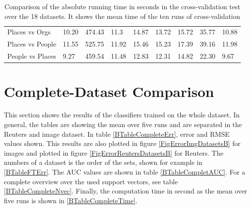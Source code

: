 \begin{table}[]
{\begin{tabular}{@{}lllllllll@{}}
			Places vs Orgs        & 10.20 & 474.43 & 11.3 & 14.87         & 13.72 & 15.72 & 35.77 & 10.88 \\
			Places vs People      & 11.55 & 525.75 & 11.92 & 15.46         & 15.23 & 17.39 & 39.16 & 11.98 \\
			People vs Places      & 9.27  & 459.54 & 11.48 & 12.83         & 12.31 & 14.82 & 22.30 & 9.67  \\ \bottomrule
	\end{tabular}}
	\caption[Time Comparison from Cross-Validation Test]{Comparison of the absolute running time in seconds in the cross-validation test over the 18 datasets. It shows the mean time of the ten runs of cross-validation\label{BTableFTTime}}
\end{table}
\FloatBarrier
\section{Complete-Dataset Comparison}\label{BSecCom}
This section shows the results of the classifiers trained on the whole dataset. 
In general, the tables are showing the mean over five runs and are separated in the Reuters and image dataset.
In table \ref{BTableCompleteErr}, error and \acs{RMSE} values shown.
This results are also plotted in figure \ref{FigErrorImgDatasetsB} for images and plotted in figure \ref{FigErrorReutersDatasetsB} for Reuters.
The numbers of a dataset is the order of the sets, shown for example in \ref{BTableFTErr}.
The \acs{AUC} values are shown in table \ref{BTableCompletAUC}.
For a complete overview over the used support vectors, see table \ref{BTableCompleteNvec}.
Finally, the computation time in second as the mean over five runs is shown in \ref{BTableCompleteTime}. 
